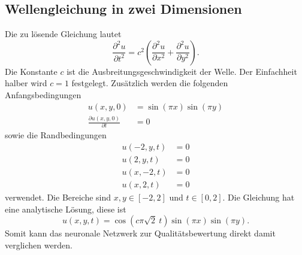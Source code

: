 \subsection{Wellengleichung in zwei Dimensionen}\label{neuronal:subsection:wellengleichung}
Die zu lösende Gleichung lautet
\begin{equation}
    \frac{\partial^2 u}{\partial t^2} = c^2 \left( \frac{\partial^2 u}{\partial x^2} + \frac{\partial^2 u}{\partial y^2} \right).
    \label{neuronal:wellengleichung}
\end{equation}
Die Konstante \( c \) ist die Ausbreitungsgeschwindigkeit der Welle. Der Einfachheit halber wird \( c = 1 \) festgelegt.
Zusätzlich werden die folgenden Anfangsbedingungen
\begin{equation}
    \begin{aligned}
        u(x, y, 0) &= \sin(\pi x) \sin(\pi y)\\
        \frac{\partial u(x, y, 0)}{\partial t} &= 0
    \end{aligned}
    \label{neuronal:wellen_anfangs}
\end{equation}
sowie die Randbedingungen
\begin{equation}
    \begin{aligned}
        u(-2, y, t) &= 0\\
        u(2, y, t) &= 0\\
        u(x, -2, t) &= 0\\
        u(x, 2, t) &= 0
    \end{aligned}
    \label{neuronal:wellen_rand}
\end{equation}
verwendet.
Die Bereiche sind \( x, y \in [-2,2] \) und \( t \in [0,2] \).
Die Gleichung hat eine analytische Lösung, diese ist
\begin{equation}
    u(x, y, t) = \cos(c \pi \sqrt{2}\: t)\sin(\pi x)\sin(\pi y).
    \label{neuronal:wellen_analytisch}
\end{equation}
Somit kann das neuronale Netzwerk zur Qualitätsbewertung direkt damit verglichen werden.

